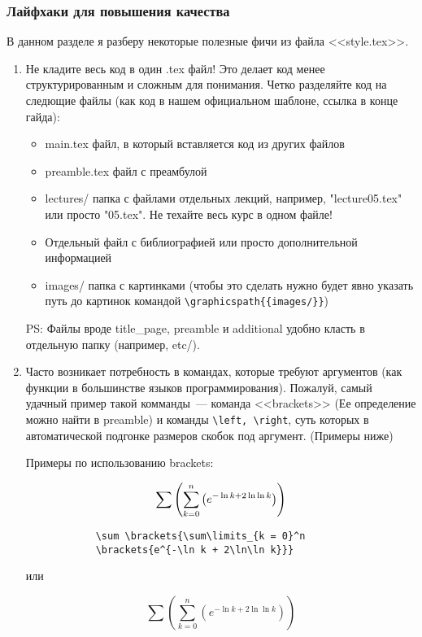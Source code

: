 \subsubsection{Лайфхаки для повышения качества}
В данном разделе я разберу некоторые полезные фичи из файла <<style.tex>>.
\begin{enumerate}
	\item Не кладите весь код в один .tex файл!
	Это делает код менее структурированным и сложным для понимания. 
	Четко разделяйте код на следющие файлы (как код в нашем официальном шаблоне, ссылка в конце гайда):
	\begin{itemize}
		\item main.tex файл, в который вставляется код из других файлов
		
		\item preamble.tex файл с преамбулой
		
		\item lectures/ папка с файлами отдельных лекций, например, "lecture05.tex" или просто "05.tex". Не техайте весь курс в одном файле!
		
		\item Отдельный файл с библиографией или просто дополнительной информацией 
		
		\item images/ папка с картинками (чтобы это сделать нужно будет явно указать путь до картинок командой \verb|\graphicspath{{images/}}|)
	\end{itemize}
	PS: Файлы вроде title\_page, preamble и additional удобно класть в отдельную папку (например, etc/).
	
	\item Часто возникает потребность в командах, которые требуют аргументов (как функции в большинстве языков программирования).
	Пожалуй, самый удачный пример такой комманды~--- команда <<brackets>> (Ее определение можно найти в preamble) и команды  \verb|\left, \right|, суть которых в автоматической подгонке размеров скобок под аргумент. (Примеры ниже)
	\begin{table*}[!ht]
		Примеры по использованию brackets:
		\begin{multicols}{2}
			$$
			\sum \left({\sum\limits_{k = 0}^n \left({e^{-\ln k + 2\ln\ln k}}\right)}\right)
			$$
			
			\columnbreak
			\begin{verbatim}
			\sum \brackets{\sum\limits_{k = 0}^n 
			\brackets{e^{-\ln k + 2\ln\ln k}}}
			\end{verbatim}
		\end{multicols}
		или
		\begin{multicols}{2}
			$$
			\sum (\sum\limits_{k = 0}^n (e^{-\ln k + 2\ln\ln k}))
			$$
			

\end{multicols}
\end{table*}
\end{enumerate}
